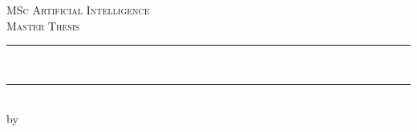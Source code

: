 
\newcommand{\red}[1]{{\color{red}{#1}}}




\begin{titlepage}

\newcommand{\HRule}{\rule{\linewidth}{0.5mm}} %
\center %
 

\textsc{\Large MSc Artificial Intelligence}\\[0.2cm]
\textsc{\Large Master Thesis}\\[0.5cm] 


\HRule \\[0.4cm]
{ \huge \bfseries \red{
    Type-driven Programming-by-Example \\
}}%
\HRule \\[0.5cm]
 

by\\[0.2cm]
\textsc{\Large \red{Tycho Grouwstra}}\\[0.2cm]
\red{6195180}\\[1cm]



\end{titlepage}
